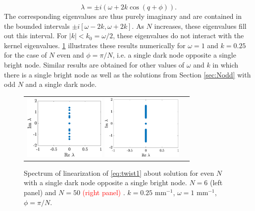 \documentclass[reprint, amsmath,amssymb,aps,pra]{revtex4-2}
\renewcommand{\revised}[1]{ \textcolor{red}{#1} }
\begin{document}
\begin{equation}\label{eq:dispersion}
\lambda = \pm i \left( \omega + 2 k \cos(q + \phi) \right).
\end{equation}
The corresponding eigenvalues are thus purely imaginary and are contained in the bounded intervals $\pm i[\omega - 2 k, \omega + 2 k]$. As $N$ increases, these eigenvalues fill out this interval. For $|k| < k_0 = \omega/2$, these eigenvalues do not interact with the kernel eigenvalues. \cref{fig:evenholespec} illustrates these results numerically for $\omega = 1$ and $k = 0.25$ for the case of $N$ even and $\phi = \pi/N$, i.e. a single dark node opposite a single bright node. Similar results are obtained for other values of $\omega$ and $k$ in which there is a single bright node as well as the solutions from Section \ref{sec:Nodd} with odd $N$ and a single dark node.
\begin{figure}
\begin{center}
\begin{tabular}{cc}
\includegraphics[width=4cm]{evenhole6spec.eps}
\includegraphics[width=4cm]{evenhole50spec.eps}
\end{tabular}
\end{center}
\caption{Spectrum of linearization of \cref{eq:twist1} about solution for even $N$ with a single dark node opposite a single bright node. $N=6$ (left panel) and $N=50$ \revised{(right panel)}. $k=0.25\text{ mm}^{-1}$, $\omega = 1\text{ mm}^{-1}$, $\phi = \pi/N$.}
\label{fig:evenholespec}
\end{figure}
\end{document}
